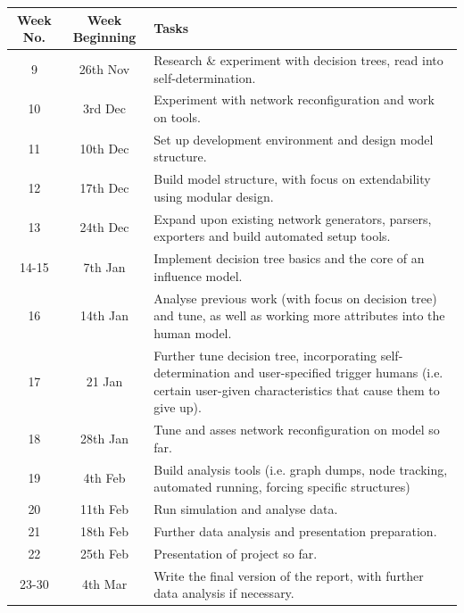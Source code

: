 \documentclass[]{article}
\begin{document}
\begin{landscape}
\begin{table}
	\centering
		\begin{tabular}{|c|c|p{12cm}|}
		\hline
			Week No. & Week Beginning & Tasks \\
			\hline
			9 & 26th Nov & Research \& experiment with decision trees, read into self-determination. \\
			\hline
			10 & 3rd Dec & Experiment with network reconfiguration and work on tools. \\
			\hline
			11 & 10th Dec & Set up development environment and design model structure. \\
			\hline
			12 & 17th Dec & Build model structure, with focus on extendability using modular design. \\
			\hline
			13 & 24th Dec & Expand upon existing network generators, parsers, exporters and build automated setup tools. \\
			\hline
			14-15 & 7th Jan & Implement decision tree basics and the core of an influence model. \\
			\hline
			16 & 14th Jan & Analyse previous work (with focus on decision tree) and tune, as well as working more attributes into the human model. \\
			\hline
			17 & 21 Jan & Further tune decision tree, incorporating self-determination and user-specified trigger humans (i.e. certain user-given characteristics that cause them to give up). \\
			\hline
			18 & 28th Jan & Tune and asses network reconfiguration on model so far.\\
			\hline
			19 & 4th Feb & Build analysis tools (i.e. graph dumps, node tracking, automated running, forcing specific structures)\\
			\hline 
			20 & 11th Feb & Run simulation and analyse data.\\
			\hline
			21 & 18th Feb & Further data analysis and presentation preparation.\\
			\hline
			22 & 25th Feb & Presentation of project so far.\\
			\hline
			23-30 & 4th Mar & Write the final version of the report, with further data analysis if necessary.\\
			\hline
		\end{tabular}
		\label{timetable}
\end{table}
\end{landscape}




\end{document}
